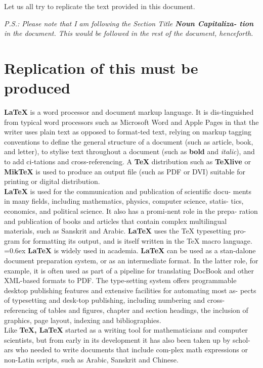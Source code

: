 \documentclass[12pt]{article}
\begin{document}
Let us all try to replicate the text provided in this document.

\textit{P.S.: Please note that I am following the Section Title \textbf{Noun Capitaliza-
tion} in the document. This would be followed in the rest of the document,
henceforth.} \newpage

\section{Replication of this must be produced}\label{sec_rep}
\textbf{LaTeX} is a word processor and document markup language. It is dis-tinguished
from typical word processors such as Microsoft Word and Apple Pages in that
the writer uses plain text as opposed to format-ted text, relying on markup
tagging conventions to define the general structure of a document (such as
article, book, and letter), to stylise text throughout a document (such as \textbf{bold}
and \textit{italic}), and to add ci-tations and cross-referencing. A \textbf{TeX} distribution such
as \textbf{TeXlive} or \textbf{MikTeX} is used to produce an output file (such as PDF or DVI)
suitable for printing or digital distribution.\\

\textbf{LaTeX} is used for the communication and publication of scientific docu-
ments in many fields, including mathematics, physics, computer science, statis-
tics, economics, and political science. It also has a promi-nent role in the prepa-
ration and publication of books and articles that contain complex multilingual
materials, such as Sanskrit and Arabic. \textbf{LaTeX} uses the TeX typesetting pro-
gram for formatting its output, and is itself written in the TeX macro language.\\

\font=0.6ex
\textbf{LaTeX} is widely used in academia. \textbf{LaTeX} can be used as a 
stan-dalone document preparation system, or as an intermediate format. In the latter role,
for example, it is often used as part of a pipeline for translating DocBook and 
other XML-based formats to PDF. The type-setting system offers programmable
desktop publishing features and extensive facilities for automating most as-
pects of typesetting and desk-top publishing, including numbering and cross-
referencing of tables and figures, chapter and section headings, the inclusion
of graphics, page layout, indexing and bibliographies.\\

Like \textbf{TeX, LaTeX} started as a writing tool for mathematicians and computer
scientists, but from early in its development it has also been taken up by schol-
ars who needed to write documents that include com-plex math expressions or
non-Latin scripts, such as Arabic, Sanskrit and Chinese.\\
\end{document}
